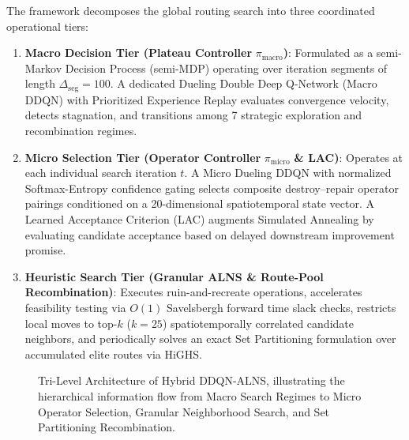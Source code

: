 \documentclass{ieeeaccess}
\begin{document}
The framework decomposes the global routing search into three coordinated operational tiers:
\begin{enumerate}
    \item \textbf{Macro Decision Tier (Plateau Controller} $\pi_{\text{macro}}$\textbf{)}: Formulated as a semi-Markov Decision Process (semi-MDP) operating over iteration segments of length $\Delta_{\text{seg}} = 100$. A dedicated Dueling Double Deep Q-Network (Macro DDQN) with Prioritized Experience Replay evaluates convergence velocity, detects stagnation, and transitions among 7 strategic exploration and recombination regimes.
    \item \textbf{Micro Selection Tier (Operator Controller} $\pi_{\text{micro}}$ \textbf{\& LAC)}: Operates at each individual search iteration $t$. A Micro Dueling DDQN with normalized Softmax-Entropy confidence gating selects composite destroy--repair operator pairings conditioned on a 20-dimensional spatiotemporal state vector. A Learned Acceptance Criterion (LAC) augments Simulated Annealing by evaluating candidate acceptance based on delayed downstream improvement promise.
    \item \textbf{Heuristic Search Tier (Granular ALNS \& Route-Pool Recombination)}: Executes ruin-and-recreate operations, accelerates feasibility testing via $O(1)$ Savelsbergh forward time slack checks, restricts local moves to top-$k$ ($k=25$) spatiotemporally correlated candidate neighbors, and periodically solves an exact Set Partitioning formulation over accumulated elite routes via HiGHS.
\end{enumerate}

\begin{figure}[!t]
\centering
{}
\caption{Tri-Level Architecture of Hybrid DDQN-ALNS, illustrating the hierarchical information flow from Macro Search Regimes to Micro Operator Selection, Granular Neighborhood Search, and Set Partitioning Recombination.}
\label{fig:architecture}
\end{figure}
\end{document}
